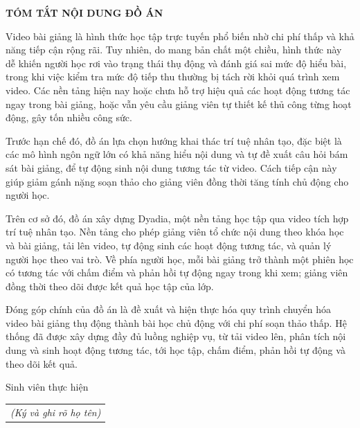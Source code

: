 \documentclass[../DoAn.tex]{subfiles}
\begin{document}
\begin{center}
    \Large{\textbf{TÓM TẮT NỘI DUNG ĐỒ ÁN}}\\
\end{center}
\vspace{1cm}
Video bài giảng là hình thức học tập trực tuyến phổ biến nhờ chi phí thấp và khả năng tiếp cận rộng rãi. Tuy nhiên, do mang bản chất một chiều, hình thức này dễ khiến người học rơi vào trạng thái thụ động và đánh giá sai mức độ hiểu bài, trong khi việc kiểm tra mức độ tiếp thu thường bị tách rời khỏi quá trình xem video. Các nền tảng hiện nay hoặc chưa hỗ trợ hiệu quả các hoạt động tương tác ngay trong bài giảng, hoặc vẫn yêu cầu giảng viên tự thiết kế thủ công từng hoạt động, gây tốn nhiều công sức.

Trước hạn chế đó, đồ án lựa chọn hướng khai thác trí tuệ nhân tạo, đặc biệt là các mô hình ngôn ngữ lớn có khả năng hiểu nội dung và tự đề xuất câu hỏi bám sát bài giảng, để tự động sinh nội dung tương tác từ video. Cách tiếp cận này giúp giảm gánh nặng soạn thảo cho giảng viên đồng thời tăng tính chủ động cho người học.

Trên cơ sở đó, đồ án xây dựng Dyadia, một nền tảng học tập qua video tích hợp trí tuệ nhân tạo. Nền tảng cho phép giảng viên tổ chức nội dung theo khóa học và bài giảng, tải lên video, tự động sinh các hoạt động tương tác, và quản lý người học theo vai trò. Về phía người học, mỗi bài giảng trở thành một phiên học có tương tác với chấm điểm và phản hồi tự động ngay trong khi xem; giảng viên đồng thời theo dõi được kết quả học tập của lớp.

Đóng góp chính của đồ án là đề xuất và hiện thực hóa quy trình chuyển hóa video bài giảng thụ động thành bài học chủ động với chi phí soạn thảo thấp. Hệ thống đã được xây dựng đầy đủ luồng nghiệp vụ, từ tải video lên, phân tích nội dung và sinh hoạt động tương tác, tới học tập, chấm điểm, phản hồi tự động và theo dõi kết quả.
\vfill
\begin{flushright}
Sinh viên thực hiện\\
\begin{tabular}{@{}c@{}}
\textit{(Ký và ghi rõ họ tên)}
\end{tabular}
\end{flushright}
\end{document}
